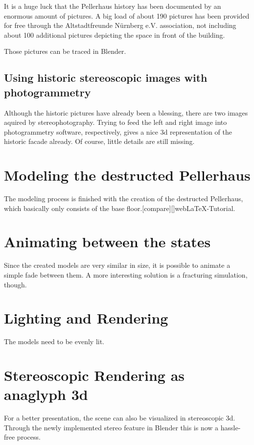 It is a huge luck that the Pellerhaus history has been documented by an enormous amount of pictures. A big load of about 190 pictures has been provided for free through the Altstadtfreunde Nürnberg e.V. association, not including about 100 additional pictures depicting the space in front of the building.

Those pictures can be traced in Blender.

\subsection{Using historic stereoscopic images with photogrammetry}

Although the historic pictures have already been a blessing, there are two images aquired by stereophotography. Trying to feed the left and right image into photogrammetry software, respectively, gives a nice 3d representation of the historic facade already. Of course, little details are still missing.






\section{Modeling the destructed Pellerhaus}

The modeling process is finished with the creation of the destructed Pellerhaus, which basically only consists of the base floor.[compare][]{webLaTeX-Tutorial}.

\section{Animating between the states}

Since the created models are very similar in size, it is possible to animate a simple fade between them.
A more interesting solution is a fracturing simulation, though.

\section{Lighting and Rendering}

The models need to be evenly lit.

\section{Stereoscopic Rendering as anaglyph 3d}

For a better presentation, the scene can also be visualized in stereoscopic 3d. Through the newly implemented stereo feature in Blender this is now a hassle-free process.